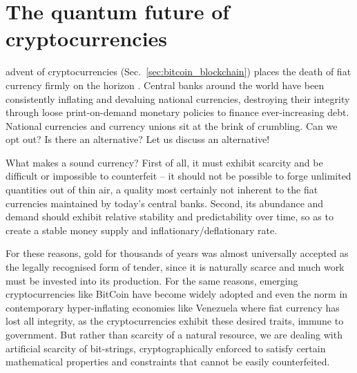 %
%

\section{The quantum future of cryptocurrencies}\label{sec:quant_coin_essay}

\newline

\newline

 advent of cryptocurrencies (Sec.~\ref{sec:bitcoin_blockchain}) places the death of fiat currency firmly on the horizon . Central banks around the world have been consistently inflating and devaluing national currencies, destroying their integrity through loose print-on-demand monetary policies to finance ever-increasing debt. National currencies and currency unions sit at the brink of crumbling. Can we opt out? Is there an alternative? Let us discuss an alternative!

What makes a sound currency? First of all, it must exhibit scarcity and be difficult or impossible to counterfeit -- it should not be possible to forge unlimited quantities out of thin air, a quality most certainly not inherent to the fiat currencies maintained by today's central banks. Second, its abundance and demand should exhibit relative stability and predictability over time, so as to create a stable money supply and inflationary/deflationary rate.

For these reasons, gold for thousands of years was almost universally accepted as the legally recognised form of tender, since it is naturally scarce and much work must be invested into its production. For the same reasons, emerging cryptocurrencies like BitCoin have become widely adopted and even the norm in contemporary hyper-inflating economies like Venezuela where fiat currency has lost all integrity, as the cryptocurrencies exhibit these desired traits, immune to government. But rather than scarcity of a natural resource, we are dealing with artificial scarcity of bit-strings, cryptographically enforced to satisfy certain mathematical properties and constraints that cannot be easily counterfeited.


